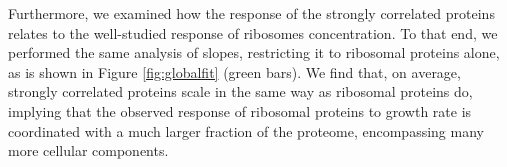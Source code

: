 Furthermore, we examined how the response of the strongly correlated proteins relates to the well-studied response of ribosomes concentration.
To that end, we performed the same analysis of slopes, restricting it to ribosomal proteins alone, as is shown in Figure \ref{fig:globalfit} (green bars).
We find that, on average, strongly correlated proteins scale in the same way as ribosomal proteins do, implying that the observed response of ribosomal proteins to growth rate is coordinated with a much larger fraction of the proteome, encompassing many more cellular components.
